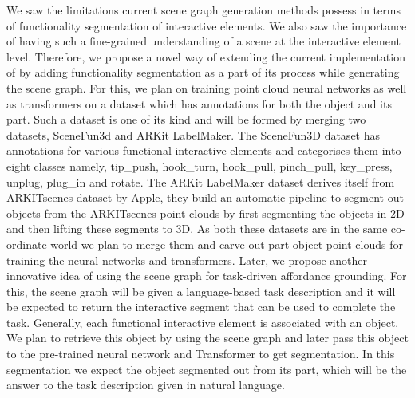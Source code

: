 We saw the limitations current scene graph generation methods possess in terms of functionality segmentation of interactive elements. We also
saw the importance of having such a fine-grained understanding of a scene at the interactive element level. Therefore, we propose a novel way of
extending the current implementation of \cite{gu2023conceptgraphsopenvocabulary3dscene} by adding functionality segmentation as a part of its process while generating the 
scene graph. For this, we plan on training point cloud neural networks as well as transformers on a dataset which has annotations for both the
object and its part. Such a dataset is one of its kind and will be formed by merging two datasets, SceneFun3d and ARKit LabelMaker.
The SceneFun3D dataset has annotations for various functional interactive elements and categorises them into eight classes namely,
tip\_push, hook\_turn, hook\_pull, pinch\_pull, key\_press, unplug, plug\_in and rotate. The ARKit LabelMaker dataset derives itself from ARKITscenes dataset
by Apple, they build an automatic pipeline to segment out objects from the ARKITscenes point clouds by first segmenting the objects in 2D and 
then lifting these segments to 3D. As both these datasets are in the same co-ordinate world we plan to merge them and carve out part-object
point clouds for training the neural networks and transformers. Later, we propose another innovative idea of using the scene graph for 
task-driven affordance grounding. For this, the scene graph will be given a language-based task description and it will be expected to return
the interactive segment that can be used to complete the task. Generally, each functional interactive element is associated with an object.
We plan to retrieve this object by using the scene graph and later pass this object to the pre-trained neural network and Transformer to get
segmentation. In this segmentation we expect the object segmented out from its part, which will be the answer to the task description given in 
natural language.